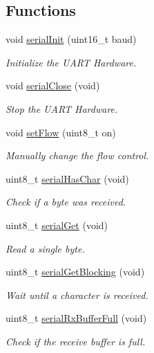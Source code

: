 \subsection*{Functions}
\begin{DoxyCompactItemize}
\item 
void \hyperlink{group__uart_ga276d676dc37f6d1dcd5672a9fe056a78}{serial\-Init} (uint16\-\_\-t baud)
\begin{DoxyCompactList}\small\item\em Initialize the U\-A\-R\-T Hardware. \end{DoxyCompactList}\item 
void \hyperlink{group__uart_gacfb02e5ea225e4641d85191f018d256a}{serial\-Close} (void)
\begin{DoxyCompactList}\small\item\em Stop the U\-A\-R\-T Hardware. \end{DoxyCompactList}\item 
void \hyperlink{group__uart_ga42630f5ff3489d61615f8b7990c865d1}{set\-Flow} (uint8\-\_\-t on)
\begin{DoxyCompactList}\small\item\em Manually change the flow control. \end{DoxyCompactList}\item 
uint8\-\_\-t \hyperlink{group__uart_ga27cc67be388d64af00ef64e22f75686d}{serial\-Has\-Char} (void)
\begin{DoxyCompactList}\small\item\em Check if a byte was received. \end{DoxyCompactList}\item 
uint8\-\_\-t \hyperlink{group__uart_ga3a3f6acfefa86dc78ec2d2455fc71709}{serial\-Get} (void)
\begin{DoxyCompactList}\small\item\em Read a single byte. \end{DoxyCompactList}\item 
uint8\-\_\-t \hyperlink{group__uart_gad779ae9434277dbe34fe292e5d8b10c8}{serial\-Get\-Blocking} (void)
\begin{DoxyCompactList}\small\item\em Wait until a character is received. \end{DoxyCompactList}\item 
uint8\-\_\-t \hyperlink{group__uart_gae09e3a1d26a94ba227c84186b6db37c0}{serial\-Rx\-Buffer\-Full} (void)
\begin{DoxyCompactList}\small\item\em Check if the receive buffer is full. \end{DoxyCompactList}\item 

\end{DoxyCompactItemize}
